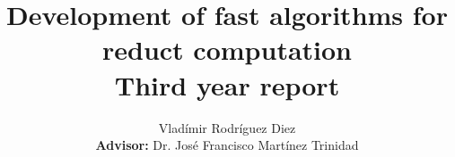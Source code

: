 \documentclass[authoryear,11pt]{elsarticle}
\begin{document}
	
	\title{Development of fast algorithms for reduct computation\\{\large Third year report}}
	
	\author{Vlad\'imir Rodr\'iguez Diez\\ 
		\textbf{Advisor:} Dr. Jos\'e Francisco Mart\'inez Trinidad}
	
	\address{Computer Science Department\\National Institute of
	Astrophysics, Optics and Electronics\\
	Luis Enrique Erro \# 1, Santa Mar\'{\i}a Tonantzintla, Puebla,
	72840, M\'{e}xico} 
	
	
	
%	

	\maketitle
	


\end{document}
